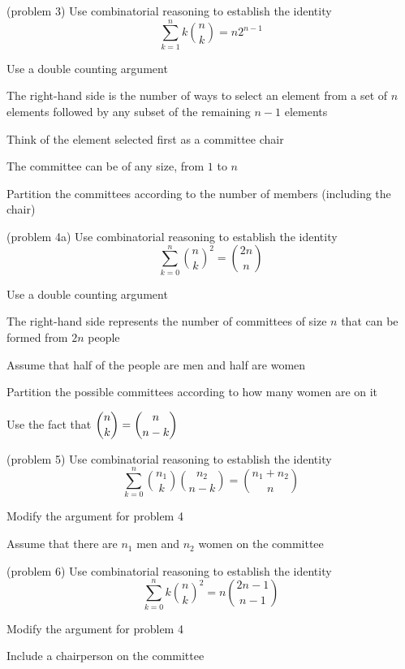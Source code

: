 \documentclass[handout]{ximera}
\begin{document}
\begin{problem}(problem 3)
Use combinatorial reasoning to establish the identity
\[
\sum_{k=1}^n k\binom{n}{k} = n2^{n-1}
\]
\begin{hint}
Use a double counting argument
\end{hint}
\begin{hint}
The right-hand side is the number of ways to select an element from a set of $n$ elements 
followed by any subset of the remaining $n-1$ elements
\end{hint}
\begin{hint}
Think of the element selected first as a committee chair
\end{hint}
\begin{hint}
The committee can be of any size, from $1$ to $n$
\end{hint}
\begin{hint}
Partition the committees according to the number of members (including the chair)
\end{hint}
\end{problem}


\begin{problem}(problem 4a)
Use combinatorial reasoning to establish the identity
\[
\sum_{k=0}^n \binom{n}{k}^2 = \binom{2n}{n}
\]
\begin{hint}
Use a double counting argument
\end{hint}
\begin{hint}
The right-hand side represents the number of committees of size $n$ that can be formed from $2n$ people
\end{hint}
\begin{hint}
Assume that half of the people are men and half are women
\end{hint}
\begin{hint}
Partition the possible committees according to how many women are on it
\end{hint}
\begin{hint}
Use the fact that $\displaystyle \binom{n}{k} = \binom{n}{n-k}$
\end{hint}
\end{problem}

\begin{problem}(problem 5)
Use combinatorial reasoning to establish the identity
\[
\sum_{k=0}^n \binom{n_1}{k}\binom{n_2}{n-k} = \binom{n_1+n_2}{n}
\]
\begin{hint}
Modify the argument for problem 4
\end{hint}
\begin{hint}
Assume that there are $n_1$ men and $n_2$ women on the committee
\end{hint}
\end{problem}

\begin{problem}(problem 6)
Use combinatorial reasoning to establish the identity
\[
\sum_{k=0}^n k\binom{n}{k}^2 = n\binom{2n-1}{n-1}
\]
\begin{hint}
Modify the argument for problem 4
\end{hint}
\begin{hint}
Include a chairperson on the committee
\end{hint}
\end{problem}
\end{document}
